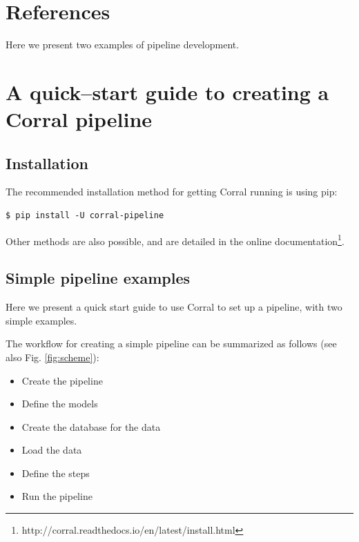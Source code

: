 \documentclass[final,5p,times,twocolumn,authoryear]{elsarticle}
\begin{document}
%
\section*{References}
\label{biblio}






\appendix

Here we present two examples of pipeline development.

\section{A quick--start guide to creating a Corral pipeline}
\label{appendixa}

\subsection{Installation}

The recommended installation method for getting Corral running
is using pip:

\begin{verbatim}
$ pip install -U corral-pipeline
\end{verbatim}

Other methods are also possible, and are detailed in the online
documentation\footnote{http://corral.readthedocs.io/en/latest/install.html}.

\subsection{Simple pipeline examples}

Here we present a quick start guide to use Corral to set up a
pipeline, with two simple examples.

The workflow for creating a simple pipeline can be summarized as follows (see also Fig. \ref{fig:scheme}):

\begin{itemize}
   \item Create the pipeline
   \item Define the models
   \item Create the database for the data
   \item Load the data
   \item Define the steps
   \item Run the pipeline
\end{itemize}
\end{document}

